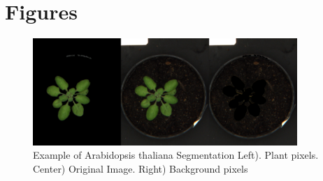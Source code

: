 \documentclass{frontiersSCNS} %
\begin{document}

\section*{Figures}


%
%
\begin{figure}[h!]
\begin{center}
\includegraphics[width=10cm]{Figure1.png}
\end{center}
 \caption{Example of Arabidopsis thaliana Segmentation Left). Plant pixels. Center) Original Image. Right) Background pixels}\label{fig1:segmentation}
\end{figure}
\end{document}
